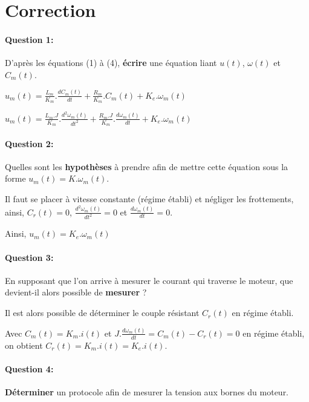 \newpage

\pagestyle{correction}

\section{Correction}

\paragraph{Question 1:} D'après les équations (1) à (4), \textbf{écrire} une équation liant $u(t)$, $\omega(t)$ et $C_m(t)$.

$u_m(t)=\frac{L_m}{K_m}.\frac{dC_m(t)}{dt}+\frac{R_m}{K_m}.C_m(t)+K_e.\omega_m(t)$

$u_m(t)=\frac{L_m.J}{K_m}.\frac{d^2\omega_m(t)}{dt^2}+\frac{R_m.J}{K_m}.\frac{d\omega_m(t)}{dt}+K_e.\omega_m(t)$


\paragraph{Question 2:} Quelles sont les \textbf{hypothèses} à prendre afin de mettre cette équation sous la forme $u_m(t)=K.\omega_m(t)$.

Il faut se placer à vitesse constante (régime établi) et négliger les frottements, ainsi, $C_r(t)=0$, $\frac{d^2\omega_m(t)}{dt^2}=0$ et $\frac{d\omega_m(t)}{dt}=0$.

Ainsi, $u_m(t)=K_e.\omega_m(t)$

\paragraph{Question 3:} En supposant que l'on arrive à mesurer le courant qui traverse le moteur, que devient-il alors possible de \textbf{mesurer} ?

Il est alors possible de déterminer le couple résistant $C_r(t)$ en régime établi.

Avec $C_m(t)=K_m.i(t)$ et $J.\frac{d\omega_m(t)}{dt}=C_m(t)-C_r(t)=0$ en régime établi, on obtient $C_r(t)=K_m.i(t)=K_e.i(t)$.

\newpage


\paragraph{Question 4:} \textbf{Déterminer} un protocole afin de mesurer la tension aux bornes du moteur.


